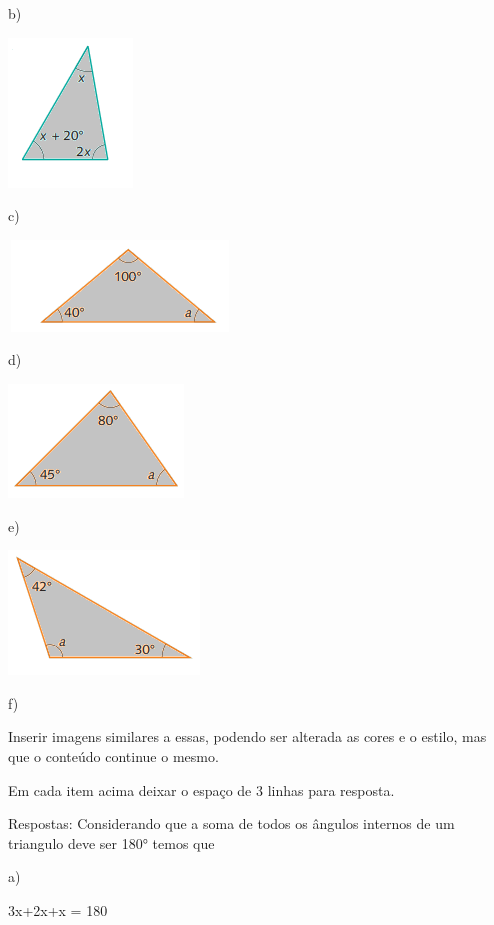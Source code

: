 {b)

\includegraphics[width=1.30208in,height=1.5625in]{./imgSAEB_8_MAT/media/image26.png}

c)

\includegraphics[width=2.33333in,height=0.95833in]{./imgSAEB_8_MAT/media/image27.png}

d)

\includegraphics[width=1.83333in,height=1.1875in]{./imgSAEB_8_MAT/media/image28.png}

e)

\includegraphics[width=2in,height=1.30208in]{./imgSAEB_8_MAT/media/image29.png}

f)

Inserir imagens similares a essas, podendo ser alterada as cores e o
estilo, mas que o conteúdo continue o mesmo.

Em cada item acima deixar o espaço de 3 linhas para resposta.

Respostas: Considerando que a soma de todos os ângulos internos de um
triangulo deve ser 180° temos que

a)

3x+2x+x = 180

}
